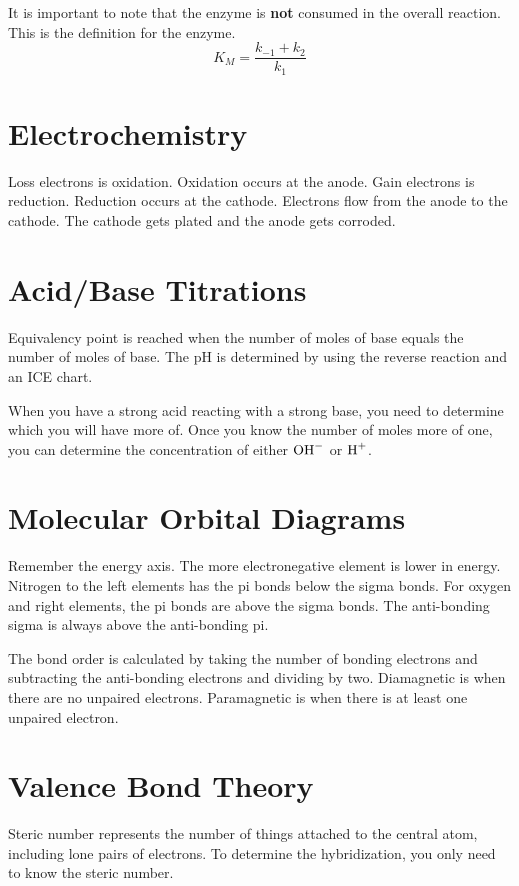 \documentclass{article}
\begin{document}
It is important to note that the enzyme is \textbf{not} consumed in the overall
reaction. This is the definition for the enzyme.
$$ K_{M} = \frac{ k_{-1} + k_{2} }{ k_{1} } $$

\section{Electrochemistry}

Loss electrons is oxidation. Oxidation occurs at the anode. Gain electrons is
reduction. Reduction occurs at the cathode. Electrons flow from the anode to
the cathode. The cathode gets plated and the anode gets corroded.

\section{Acid/Base Titrations}

Equivalency point is reached when the number of moles of base equals the number
of moles of base. The pH is determined by using the reverse reaction and an ICE
chart.

When you have a strong acid reacting with a strong base, you need to determine
which you will have more of. Once you know the number of moles more of one, you
can determine the concentration of either $\ce{OH-}$ or $\ce{H+}$.

\section{Molecular Orbital Diagrams}

Remember the energy axis. The more electronegative element is lower in energy.
Nitrogen to the left elements has the pi bonds below the sigma bonds. For oxygen
and right elements, the pi bonds are above the sigma bonds. The anti-bonding
sigma is always above the anti-bonding pi.

The bond order is calculated by taking the number of bonding electrons and
subtracting the anti-bonding electrons and dividing by two. Diamagnetic is when
there are no unpaired electrons. Paramagnetic is when there is at least one
unpaired electron.

\section{Valence Bond Theory}

Steric number represents the number of things attached to the central atom,
including lone pairs of electrons. To determine the hybridization, you only need
to know the steric number.
\end{document}
